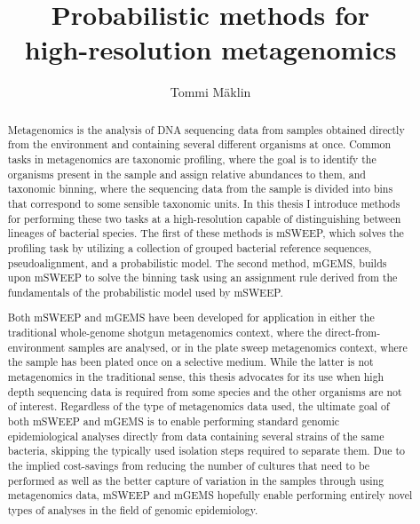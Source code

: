 \documentclass[officiallayout]{tktla}
\title{Probabilistic methods for \\ high-resolution metagenomics}
\author{Tommi Mäklin}
\begin{document}
\frontmatter

\maketitle

\begin{abstract}
  Metagenomics is the analysis of DNA sequencing data from samples
  obtained directly from the environment and containing several
  different organisms at once. Common tasks in metagenomics are
  taxonomic profiling, where the goal is to identify the organisms
  present in the sample and assign relative abundances to them, and
  taxonomic binning, where the sequencing data from the sample is
  divided into bins that correspond to some sensible taxonomic
  units. In this thesis I introduce methods for performing these two
  tasks at a high-resolution capable of distinguishing between
  lineages of bacterial species. The first of these methods is mSWEEP,
  which solves the profiling task by utilizing a collection of grouped
  bacterial reference sequences, pseudoalignment, and a probabilistic
  model. The second method, mGEMS, builds upon mSWEEP to solve the
  binning task using an assignment rule derived from the fundamentals
  of the probabilistic model used by mSWEEP.

  Both mSWEEP and mGEMS have been developed for application in either
  the traditional whole-genome shotgun metagenomics context, where the
  direct-from-environment samples are analysed, or in the plate sweep
  metagenomics context, where the sample has been plated once on a
  selective medium. While the latter is not metagenomics in the
  traditional sense, this thesis advocates for its use when high depth
  sequencing data is required from some species and the other
  organisms are not of interest. Regardless of the type of
  metagenomics data used, the ultimate goal of both mSWEEP and mGEMS
  is to enable performing standard genomic epidemiological analyses
  directly from data containing several strains of the same bacteria,
  skipping the typically used isolation steps required to separate
  them. Due to the implied cost-savings from reducing the number of
  cultures that need to be performed as well as the better capture of
  variation in the samples through using metagenomics data, mSWEEP and
  mGEMS hopefully enable performing entirely novel types of analyses
  in the field of genomic epidemiology.

\end{abstract}
\end{document}
